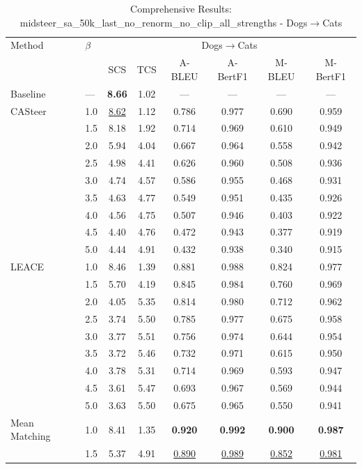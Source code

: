 \begin{table}[htbp]
\centering
\caption{Comprehensive Results: midsteer\_sa\_50k\_last\_no\_renorm\_no\_clip\_all\_strengths - Dogs$\to$Cats}
\label{tab:single_experiment_table_without_clipping_dogs_to_cats}
\begin{tabular}{l|l|cccccc|}
\hline
Method & $\beta$ & \multicolumn{6}{c|}{Dogs$\rightarrow$Cats} \\
 &  & SCS & TCS & A-BLEU & A-BertF1 & M-BLEU & M-BertF1 \\
\hline
Baseline & — & \textbf{8.66} & 1.02 & — & — & — & — \\
\hline
CASteer & 1.0 & \underline{8.62} & 1.12 & 0.786 & 0.977 & 0.690 & 0.959 \\
 & 1.5 & 8.18 & 1.92 & 0.714 & 0.969 & 0.610 & 0.949 \\
 & 2.0 & 5.94 & 4.04 & 0.667 & 0.964 & 0.558 & 0.942 \\
 & 2.5 & 4.98 & 4.41 & 0.626 & 0.960 & 0.508 & 0.936 \\
 & 3.0 & 4.74 & 4.57 & 0.586 & 0.955 & 0.468 & 0.931 \\
 & 3.5 & 4.63 & 4.77 & 0.549 & 0.951 & 0.435 & 0.926 \\
 & 4.0 & 4.56 & 4.75 & 0.507 & 0.946 & 0.403 & 0.922 \\
 & 4.5 & 4.40 & 4.76 & 0.472 & 0.943 & 0.377 & 0.919 \\
 & 5.0 & 4.44 & 4.91 & 0.432 & 0.938 & 0.340 & 0.915 \\
\hline
LEACE & 1.0 & 8.46 & 1.39 & 0.881 & 0.988 & 0.824 & 0.977 \\
 & 1.5 & 5.70 & 4.19 & 0.845 & 0.984 & 0.760 & 0.969 \\
 & 2.0 & 4.05 & 5.35 & 0.814 & 0.980 & 0.712 & 0.962 \\
 & 2.5 & 3.74 & 5.50 & 0.785 & 0.977 & 0.675 & 0.958 \\
 & 3.0 & 3.77 & 5.51 & 0.756 & 0.974 & 0.644 & 0.954 \\
 & 3.5 & 3.72 & 5.46 & 0.732 & 0.971 & 0.615 & 0.950 \\
 & 4.0 & 3.78 & 5.31 & 0.714 & 0.969 & 0.593 & 0.947 \\
 & 4.5 & 3.61 & 5.47 & 0.693 & 0.967 & 0.569 & 0.944 \\
 & 5.0 & 3.63 & 5.50 & 0.675 & 0.965 & 0.550 & 0.941 \\
\hline
Mean Matching & 1.0 & 8.41 & 1.35 & \textbf{0.920} & \textbf{0.992} & \textbf{0.900} & \textbf{0.987} \\
 & 1.5 & 5.37 & 4.91 & \underline{0.890} & \underline{0.989} & \underline{0.852} & \underline{0.981} \\

\end{tabular}
\end{table}
